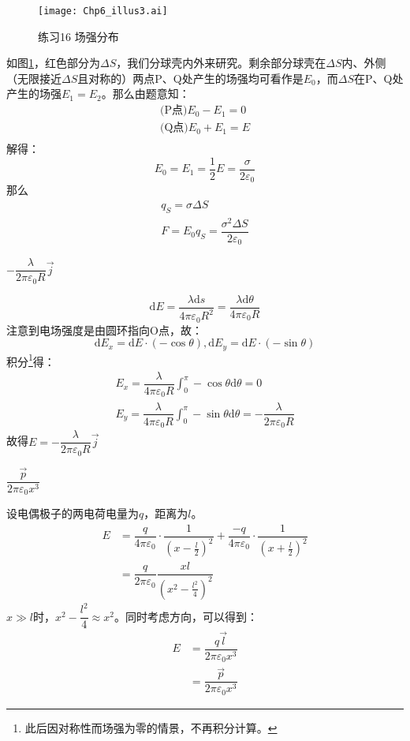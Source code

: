 \documentclass[b5paper,opensource,sourcefont,parskip]{qyxf-book}
\newcommand{\di}[1]{\mathrm{d}#1}
\begin{document}
\begin{figure}[!htbp]
	\centering
	\texttt{[image: Chp6\_illus3.ai]}
	\caption{练习16 场强分布}\label{fig:c6-t16}
\end{figure}
如图\ref{fig:c6-t16}，红色部分为$\Delta S$，我们分球壳内外来研究。剩余部分球壳在$\Delta S$内、外侧（无限接近$\Delta S$且对称的）两点P、Q处产生的场强均可看作是$E_0$，而$\Delta S$在P、Q处产生的场强$E_1=E_2$。那么由题意知：
\begin{gather*}
	\text{(P点)}E_0-E_1=0\\
	\text{(Q点)}E_0+E_1=E\\
\end{gather*}
解得：
\[
E_0=E_1=\dfrac{1}{2}E=\dfrac{\sigma}{2\varepsilon_0}
\]
那么
\begin{gather*}
	q_S=\sigma\Delta S\\
	F=E_0q_S=\dfrac{\sigma^2\Delta S}{2\varepsilon_0}
\end{gather*}

$-\dfrac{\lambda}{2\pi\varepsilon_0R}\vec{j}$

\solve
\[
\di{E}=\dfrac{\lambda \di{s}}{4\pi \varepsilon_0 R^2}=\dfrac{\lambda \di{\theta}}{4\pi \varepsilon_0 R}
\]
注意到电场强度是由圆环指向O点，故：
\[
\di{E_x}=\di{E}\cdot (-\cos\theta),\di{E_y}=\di{E}\cdot (-\sin\theta)
\]
积分\footnote{此后因对称性而场强为零的情景，不再积分计算。}得：
\begin{gather*}
	E_x=\dfrac{\lambda}{4\pi \varepsilon_0 R}\int_0^{\pi} -\cos\theta\di{\theta}=0\\
	E_y=\dfrac{\lambda}{4\pi \varepsilon_0 R}\int_0^{\pi} -\sin\theta\di{\theta}=-\dfrac{\lambda}{2\pi\varepsilon_0R}
\end{gather*}
故得$E=-\dfrac{\lambda}{2\pi\varepsilon_0R}\vec{j}$

$\dfrac{\vec{p}}{2\pi\varepsilon_0x^3}$

\solve
设电偶极子的两电荷电量为$q$，距离为$l$。
\begin{align*}
	E&=\dfrac{q}{4\pi\varepsilon_0}\cdot \dfrac{1}{(x-\frac{l}{2})^2}+\dfrac{-q}{4\pi\varepsilon_0}\cdot \dfrac{1}{(x+\frac{l}{2})^2}\\
	&=\dfrac{q}{2\pi\varepsilon_0}\dfrac{xl}{{(x^2-\frac{l^2}{4})}^2}
\end{align*}
$x\gg l$时，$x^2-\dfrac{l^2}{4}\approx x^2$。同时考虑方向，可以得到：
\begin{align*}
	E&=\dfrac{q\vec{l}}{2\pi\varepsilon_0x^3}\\
	&=\dfrac{\vec{p}}{2\pi\varepsilon_0x^3}
\end{align*}
\end{document}
